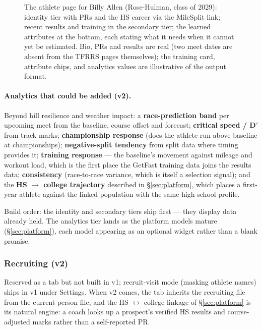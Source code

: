 \documentclass[11pt]{article}
\begin{document}
\begin{figure}[H]
\caption{The athlete page for Billy Allen (Rose-Hulman, class of 2029):
identity tier with PRs and the HS career via the MileSplit link; recent
results and training in the secondary tier; the learned attributes at the
bottom, each stating what it needs when it cannot yet be estimated. Bio,
PRs and results are real (two meet dates are absent from the TFRRS pages
themselves); the training card, attribute chips, and analytics values are
illustrative of the output format.}
\label{fig:athletewire}
\end{figure}

\paragraph{Analytics that could be added (v2).} Beyond hill resilience and weather
impact: a \textbf{race-prediction band} per upcoming meet from the baseline,
course offset and forecast; \textbf{critical speed / D$'$} from track marks;
\textbf{championship response} (does the athlete run above baseline at
championships); \textbf{negative-split tendency} from split data where timing
provides it; \textbf{training response} --- the baseline's movement against
mileage and workout load, which is the first place the GetFast training data
joins the results data; \textbf{consistency} (race-to-race variance, which is
itself a selection signal); and the \textbf{HS $\to$ college trajectory}
described in \S\ref{sec:platform}, which places a first-year athlete against
the linked population with the same high-school profile.

Build order: the identity and secondary tiers ship first --- they display
data already held. The analytics tier lands as the platform models mature
(\S\ref{sec:platform}), each model appearing as an optional widget rather
than a blank promise.

\subsubsection{Recruiting (v2)}

Reserved as a tab but not built in v1; recruit-visit mode (masking athlete
names) ships in v1 under Settings. When v2 comes, the tab inherits the
recruiting file from the current person file, and the HS $\leftrightarrow$
college linkage of \S\ref{sec:platform} is its natural engine: a coach looks
up a prospect's verified HS results and course-adjusted marks rather than a
self-reported PR.
\end{document}
